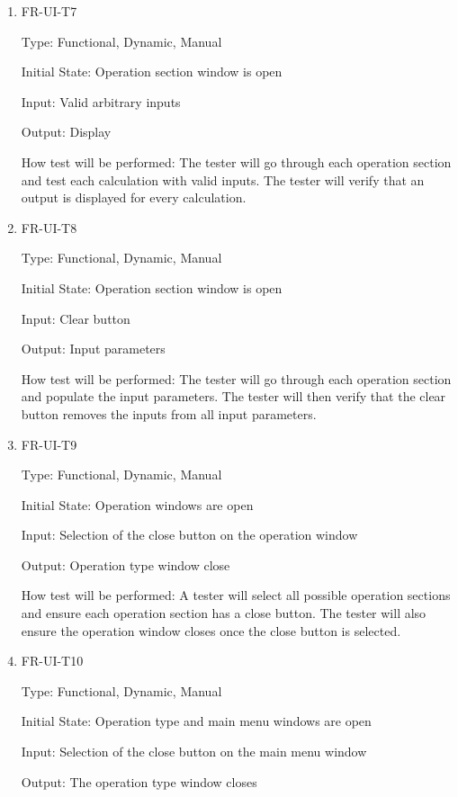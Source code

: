 \documentclass[12pt, titlepage]{article}
\begin{document}
\begin{enumerate}
\item{FR-UI-T7\\}

Type: Functional, Dynamic, Manual
					
Initial State: Operation section window is open
					
Input: Valid arbitrary inputs
					
Output: Display

How test will be performed: The tester will go through each operation section and test each calculation with valid inputs. The tester will verify that an output is displayed for every calculation.


\item{FR-UI-T8\\}

Type: Functional, Dynamic, Manual
					
Initial State: Operation section window is open
					
Input: Clear button
					
Output: Input parameters

How test will be performed: The tester will go through each operation section and populate the input parameters. The tester will then verify that the clear button removes the inputs from all input parameters.

\item{FR-UI-T9\\}

Type: Functional, Dynamic, Manual
					
Initial State: Operation windows are open
					
Input: Selection of the close button on the operation window
					
Output: Operation type window close
					
How test will be performed: A tester will select all possible operation sections and ensure each operation section has a close button. The tester will also ensure the operation window closes once the close button is selected.

\item{FR-UI-T10\\}

Type: Functional, Dynamic, Manual
					
Initial State: Operation type and main menu windows are open
					
Input: Selection of the close button on the main menu window 
					
Output: The operation type window closes
					

\end{enumerate}
\end{document}
